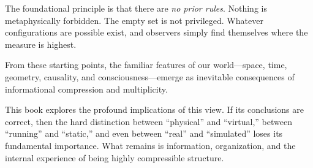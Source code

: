 The foundational principle is that there are \emph{no prior rules}. Nothing is metaphysically forbidden. The empty set is not privileged.
Whatever configurations are possible exist, and observers simply find themselves where the measure is highest.

From these starting points, the familiar features of our world---space, time, geometry, causality, and consciousness---emerge as inevitable consequences of informational compression and multiplicity.

This book explores the profound implications of this view. If its conclusions are correct, then the hard distinction between ``physical'' and ``virtual,'' between ``running'' and ``static,'' and even between ``real'' and ``simulated'' loses its fundamental importance. What remains is information, organization, and the internal experience of being highly compressible structure.




